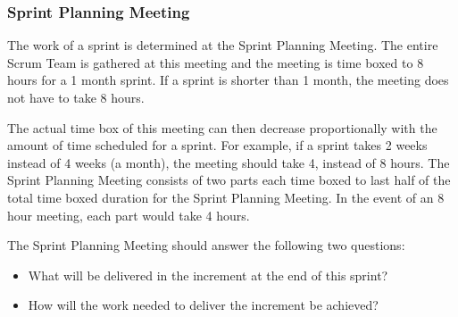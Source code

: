 \subsubsection{Sprint Planning Meeting}

The work of a sprint is determined at the Sprint Planning Meeting. The entire Scrum Team is 
gathered at this meeting and the meeting is time boxed to 8 hours for a 1 month sprint. If a 
sprint is shorter than 1 month, the meeting does not have to take 8 
hours\cite{scrumguide11}. 


The actual time box of this meeting can then decrease proportionally with the amount of time 
scheduled for a sprint. For example, if a sprint takes 2 weeks instead of 4 weeks (a month), 
the meeting should take 4, instead of 8 hours\cite{scrumguide11}.  The Sprint Planning 
Meeting consists of two parts each time boxed to last half of the total time boxed duration 
for the Sprint Planning Meeting. In the event of an 8 hour meeting, each part would take 4 
hours\cite{scrumguide11}.


The Sprint Planning Meeting should answer the following two questions\cite{scrumguide11}:

\begin{itemize}
	\item What will be delivered in the increment at the end of this sprint?
	\item	How will the work needed to deliver the increment be achieved?
\end{itemize}



